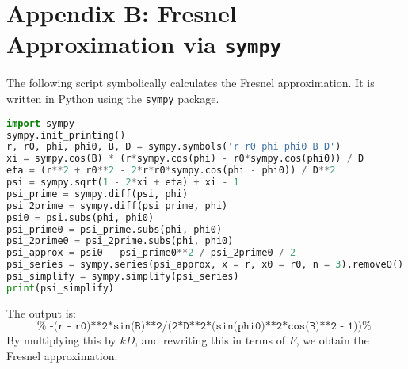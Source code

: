 \documentclass{article}
\begin{document}
    \section{Appendix B: Fresnel Approximation via \texttt{sympy}}
        The following script symbolically calculates the Fresnel approximation.
        It is written in Python using the \texttt{sympy} package.
        \begin{lstlisting}[language = Python]
import sympy
sympy.init_printing()
r, r0, phi, phi0, B, D = sympy.symbols('r r0 phi phi0 B D')
xi = sympy.cos(B) * (r*sympy.cos(phi) - r0*sympy.cos(phi0)) / D
eta = (r**2 + r0**2 - 2*r*r0*sympy.cos(phi - phi0)) / D**2
psi = sympy.sqrt(1 - 2*xi + eta) + xi - 1
psi_prime = sympy.diff(psi, phi)
psi_2prime = sympy.diff(psi_prime, phi)
psi0 = psi.subs(phi, phi0)
psi_prime0 = psi_prime.subs(phi, phi0)
psi_2prime0 = psi_2prime.subs(phi, phi0)
psi_approx = psi0 - psi_prime0**2 / psi_2prime0 / 2
psi_series = sympy.series(psi_approx, x = r, x0 = r0, n = 3).removeO()
psi_simplify = sympy.simplify(psi_series)
print(psi_simplify)
        \end{lstlisting}
        The output is:
        \begin{equation}
            \texttt{%
                -(r - r0)**2*sin(B)**2/(2*D**2*(sin(phi0)**2*cos(B)**2 - 1))%
            }
        \end{equation}
        By multiplying this by $kD$, and rewriting this in terms of $F$,
        we obtain the Fresnel approximation.
\end{document}

